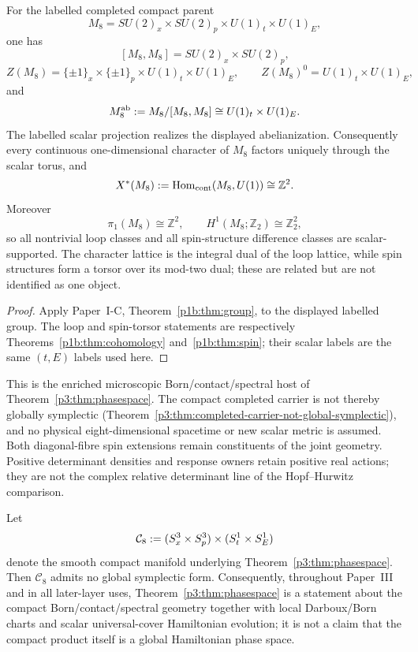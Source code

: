 \documentclass[12pt,a4paper]{article}
\begin{document}
\begin{theorem}
\label{p3b:thm:v193-m8-derived-center-abelianization}
For the labelled completed compact parent
\[
 M_8=SU(2)_x\times SU(2)_p\times U(1)_t\times U(1)_E,
\]
one has
\[
 [M_8,M_8]=SU(2)_x\times SU(2)_p,
\]
\[
 Z(M_8)=\{\pm1\}_x\times\{\pm1\}_p
       \times U(1)_t\times U(1)_E,
 \qquad
 Z(M_8)^0=U(1)_t\times U(1)_E,
\]
and
\[
 M_8^{\rm ab}:=M_8/[M_8,M_8]
 \cong U(1)_t\times U(1)_E.
\]
The labelled scalar projection realizes the displayed abelianization.
Consequently every continuous one-dimensional character of \(M_8\) factors
uniquely through the scalar torus, and
\[
 X^*(M_8):=\operatorname{Hom}_{\rm cont}(M_8,U(1))\cong\mathbb Z^2.
\]
Moreover
\[
 \pi_1(M_8)\cong\mathbb Z^2,
 \qquad
 H^1(M_8;\mathbb Z_2)\cong\mathbb Z_2^2,
\]
so all nontrivial loop classes and all spin-structure difference classes are
scalar-supported.  The character lattice is the integral dual of the loop
lattice, while spin structures form a torsor over its mod-two dual; these are
related but are not identified as one object.
\end{theorem}

\begin{proof}
Apply Paper~I-C, Theorem~\ref{p1b:thm:group}, to the displayed labelled
group.  The loop and spin-torsor statements are respectively
Theorems~\ref{p1b:thm:cohomology} and~\ref{p1b:thm:spin}; their scalar
labels are the same \((t,E)\) labels used here.
\end{proof}

This is the enriched microscopic Born/contact/spectral host of
Theorem~\ref{p3:thm:phasespace}.  The compact completed carrier is not
thereby globally symplectic
(Theorem~\ref{p3:thm:completed-carrier-not-global-symplectic}), and
no physical eight-dimensional spacetime or new scalar metric is
assumed.  Both diagonal-fibre spin extensions remain constituents
of the joint geometry.  Positive determinant densities and response
owners retain positive real actions; they are not the complex
relative determinant line of the Hopf--Hurwitz comparison.


\begin{theorem}
\label{p3:thm:completed-carrier-not-global-symplectic}
Let
\[
\mathcal C_8:=(S^3_x\times S^3_p)\times(S^1_t\times S^1_E)
\]
denote the smooth compact manifold underlying Theorem~\ref{p3:thm:phasespace}.  Then
\(\mathcal C_8\) admits no global symplectic form.  Consequently, throughout Paper~III and in
all later-layer uses, Theorem~\ref{p3:thm:phasespace} is a statement about the compact
Born/contact/spectral geometry together with local Darboux/Born charts and scalar universal-cover
Hamiltonian evolution; it is not a claim that the compact product itself is a global Hamiltonian phase space.
\end{theorem}
\end{document}

